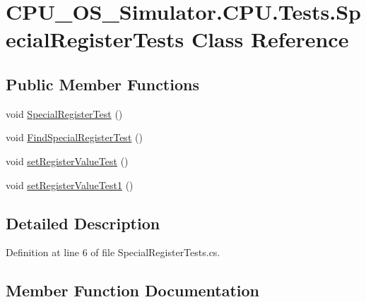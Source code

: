 \hypertarget{class_c_p_u___o_s___simulator_1_1_c_p_u_1_1_tests_1_1_special_register_tests}{}\section{C\+P\+U\+\_\+\+O\+S\+\_\+\+Simulator.\+C\+P\+U.\+Tests.\+Special\+Register\+Tests Class Reference}
\label{class_c_p_u___o_s___simulator_1_1_c_p_u_1_1_tests_1_1_special_register_tests}
\subsection*{Public Member Functions}
\begin{DoxyCompactItemize}
\item 
void \hyperlink{class_c_p_u___o_s___simulator_1_1_c_p_u_1_1_tests_1_1_special_register_tests_a1fb5b50362573ae62720d1c2b7e4a9ba}{Special\+Register\+Test} ()
\item 
void \hyperlink{class_c_p_u___o_s___simulator_1_1_c_p_u_1_1_tests_1_1_special_register_tests_a2897acd6a583aab1dd723b13c9f88e60}{Find\+Special\+Register\+Test} ()
\item 
void \hyperlink{class_c_p_u___o_s___simulator_1_1_c_p_u_1_1_tests_1_1_special_register_tests_a69f7c3f739036835145a8fadd7112d9e}{set\+Register\+Value\+Test} ()
\item 
void \hyperlink{class_c_p_u___o_s___simulator_1_1_c_p_u_1_1_tests_1_1_special_register_tests_a3c0a8e74b166d73fe40bbf4130917687}{set\+Register\+Value\+Test1} ()
\end{DoxyCompactItemize}


\subsection{Detailed Description}


Definition at line 6 of file Special\+Register\+Tests.\+cs.



\subsection{Member Function Documentation}
\hypertarget{class_c_p_u___o_s___simulator_1_1_c_p_u_1_1_tests_1_1_special_register_tests_a2897acd6a583aab1dd723b13c9f88e60}{}
